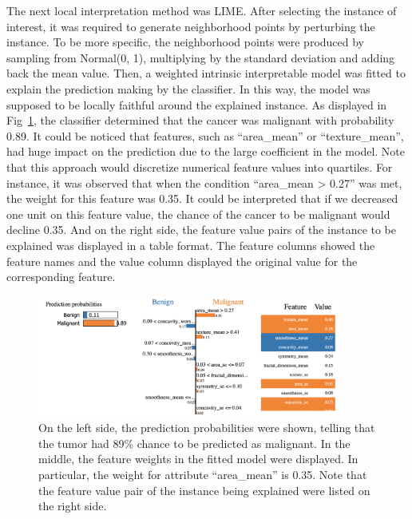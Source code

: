 The next local interpretation method was LIME. After selecting the instance of interest, it was required to generate neighborhood points by perturbing the instance. To be more specific, the neighborhood points were produced by sampling from Normal(0, 1), multiplying by the standard deviation and adding back the mean value. Then, a weighted intrinsic interpretable model was fitted to explain the prediction making by the classifier. In this way, the model was supposed to be locally faithful around the explained instance. As displayed in Fig~\ref{fig:breast_lime}, the classifier determined that the cancer was malignant with probability 0.89. It could be noticed that features, such as “area\_mean” or “texture\_mean”, had huge impact on the prediction due to the large coefficient in the model. Note that this approach would discretize numerical feature values into quartiles. For instance, it was observed that when the condition “area\_mean > 0.27” was met, the weight for this feature was 0.35. It could be interpreted that if we decreased one unit on this feature value, the chance of the cancer to be malignant would decline 0.35. And on the right side, the feature value pairs of the instance to be explained was displayed in a table format. The feature columns showed the feature names and the value column displayed the original value for the corresponding feature. 

\begin{figure}[H]
	\includegraphics[width=0.9\textwidth]{imgs/breast_lime_plot.png}
	\caption{On the left side, the prediction probabilities were shown, telling that the tumor had 89\% chance to be predicted as malignant. In the middle, the feature weights in the fitted model were  displayed. In particular, the weight for attribute “area\_mean” is 0.35. Note that the feature value pair of the instance being explained were listed on the right side.}
	\label{fig:breast_lime}
\end{figure}

